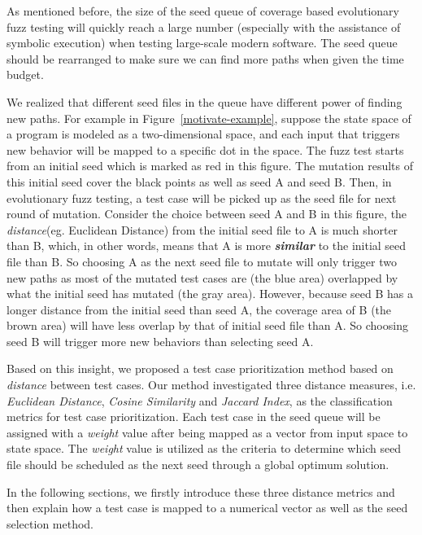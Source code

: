 As mentioned before, the size of the seed queue of coverage based evolutionary fuzz testing will quickly reach a large number (especially with the assistance of symbolic execution) when testing large-scale modern software. The seed queue should be rearranged to make sure we can find more paths when given the time budget.


We realized that different seed files in the queue have different power of finding new paths. For example in Figure~\ref{motivate-example}, suppose the state space of a program is modeled as a two-dimensional space, and each input that triggers new behavior will be mapped to a specific dot in the space. The fuzz test starts from an initial seed which is marked as red in this figure. The mutation results of this initial seed cover the black points as well as seed A and seed B. Then, in evolutionary fuzz testing, a test case will be picked up as the seed file for next round of mutation. 
Consider the choice between seed A and B in this figure, the \emph{distance}(eg. Euclidean Distance) from the initial seed file to A is much shorter than B, which, in other words, means that A is more \textbf{\textit{similar}} to the initial seed file than B. So choosing A as the next seed file to mutate will only trigger two new paths as most of the mutated test cases are (the blue area) overlapped by what the initial seed has mutated (the gray area). However, because seed B has a longer distance from the initial seed than seed A, the coverage area of B (the brown area) will have less overlap by that of initial seed file than A. So choosing seed B will trigger more new behaviors than selecting seed A.


Based on this insight, we proposed a test case prioritization method based on \emph{distance} between test cases. Our method investigated three distance measures, i.e. \textit{Euclidean Distance}, \textit{Cosine Similarity} and \textit{Jaccard Index}, as the classification metrics for test case prioritization. Each test case in the seed queue will be assigned with a \emph{weight} value after being mapped as a vector from input space to state space. The \emph{weight} value is utilized as the criteria to determine which seed file should be scheduled as the next seed through a global optimum solution.

In the following sections, we firstly introduce these three distance metrics and then explain how a test case is mapped to a numerical vector as well as the seed selection method.

